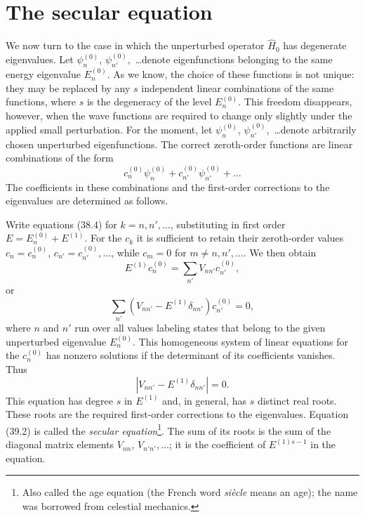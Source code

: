 \section{The secular equation}

We now turn to the case in which the unperturbed operator $\hat H_0$ has
degenerate eigenvalues. Let $\psi_n^{(0)}$, $\psi_{n'}^{(0)}$,~\ldots denote
eigenfunctions belonging to the same energy eigenvalue $E_n^{(0)}$. As we
know, the choice of these functions is not unique: they may be replaced by
any $s$ independent linear combinations of the same functions, where $s$ is
the degeneracy of the level $E_n^{(0)}$. This freedom disappears, however,
when the wave functions are required to change only slightly under the
applied small perturbation.
For the moment, let $\psi_n^{(0)}$, $\psi_{n'}^{(0)}$,~\ldots denote
arbitrarily chosen unperturbed eigenfunctions. The correct zeroth-order
functions are linear combinations of the form
\[
  c_n^{(0)}\psi_n^{(0)}+c_{n'}^{(0)}\psi_{n'}^{(0)}+\ldots
\]
The coefficients in these combinations and the first-order corrections to
the eigenvalues are determined as follows.

Write equations (38.4) for $k=n,n',\ldots$, substituting in first order
$E=E_n^{(0)}+E^{(1)}$. For the $c_k$ it is sufficient to retain their
zeroth-order values $c_n=c_n^{(0)}$, $c_{n'}=c_{n'}^{(0)},\ldots$, while
$c_m=0$ for $m\ne n,n',\ldots$. We then obtain
\[
  E^{(1)}c_n^{(0)}=\sum_{n'}V_{nn'}c_{n'}^{(0)},
\]
or
\begin{equation}
  \sum_{n'}(V_{nn'}-E^{(1)}\delta_{nn'})c_{n'}^{(0)}=0,
  \tag{39.1}
\end{equation}
where $n$ and $n'$ run over all values labeling states that belong to the
given unperturbed eigenvalue $E_n^{(0)}$. This homogeneous system of linear
equations for the $c_n^{(0)}$ has nonzero solutions if the determinant of its
coefficients vanishes. Thus
\begin{equation}
  |V_{nn'}-E^{(1)}\delta_{nn'}|=0.
  \tag{39.2}
\end{equation}
This equation has degree $s$ in $E^{(1)}$ and, in general, has $s$ distinct
real roots. These roots are the required first-order corrections to the
eigenvalues. Equation (39.2) is called the \emph{secular
equation}\footnote{Also called the age equation (the French word
\emph{siècle} means an age); the name was borrowed from celestial
mechanics.}. The sum of its roots is the sum of the diagonal matrix elements
$V_{nn}$, $V_{n'n'},\ldots$; it is the coefficient of $E^{(1)s-1}$ in the
equation.

